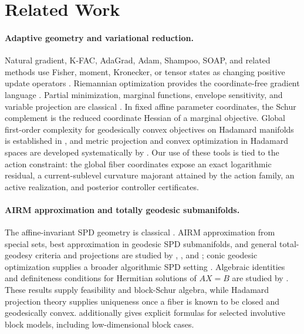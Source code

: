 \section{Related Work}
\label{sec:related-work}

\paragraph{Adaptive geometry and variational reduction.}
Natural gradient, K-FAC, AdaGrad, Adam, Shampoo, SOAP, and related methods use
Fisher, moment, Kronecker, or tensor states as changing positive update
operators \cite{amari1998natural,martens2015kfac,duchi2011adagrad,
kingma2014adam,gupta2018shampoo,morwani2024shampoo,vyas2025soap}.
Riemannian optimization provides the coordinate-free gradient language
\cite{absil2008optimization,boumal2023introduction}.  Partial minimization,
marginal functions, envelope sensitivity, and variable projection are
classical \cite{rockafellar1970convex,rockafellar1998variational,
bonnans2000perturbation,golub1973variableprojection}.  In fixed affine
parameter coordinates, the Schur complement is the reduced coordinate Hessian
of a marginal objective.  Global
first-order complexity for geodesically convex objectives on Hadamard
manifolds is established in \cite{zhang2016firstorder}, and metric projection
and convex optimization in Hadamard spaces are developed systematically by
\cite{bacak2014convex}.  Our use of these tools is tied to the action
constraint: the global fiber coordinates expose an exact logarithmic
residual, a current-sublevel curvature majorant attained by the action family,
an active realization, and posterior controller certificates.

\paragraph{AIRM approximation and totally geodesic submanifolds.}
The affine-invariant SPD geometry is classical
\cite{bhatia2007positive,pennec2006riemannian}.  AIRM approximation from
special sets, best approximation in geodesic SPD submanifolds, and general
total-geodesy criteria and projections are studied by
\cite{bhatia2014approximation}, \cite{lim2004best}, and
\cite{tumpach2024totally}; conic geodesic optimization supplies a broader
algorithmic SPD setting \cite{sra2015conic}.  Algebraic identities and
definiteness conditions for Hermitian solutions of \(AX=B\) are studied by
\cite{tian2013hermitian}.  These results supply feasibility and block-Schur
algebra, while Hadamard projection theory supplies uniqueness once a fiber is
known to be closed and geodesically convex.  \cite{lim2004best} additionally
gives explicit formulas for selected involutive block models, including
low-dimensional block cases.

